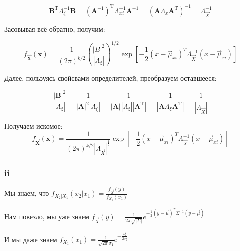 \documentclass[a4paper,12pt]{article}
\begin{document}
\[
\mathbf{B}^{\mathrm{T}} \Lambda_{\xi}^{-1} \mathbf{B}=\left(\mathbf{A}^{-1}\right)^{\mathrm{T}} \Lambda_{xi}^{-1} \mathbf{A}^{-1}=\left(\mathbf{A} \Lambda_{x} \mathbf{A}^{\mathrm{T}}\right)^{-1}=\Lambda_{\vec{X}}^{-1}
\]

Засовывая всё обратно, получим:

\[
f_{\mathbf{\vec{X}}}(\boldsymbol{x})=\frac{1}{(2 \pi)^{k / 2}}\left(\frac{|B|^{2}}{\left|\Lambda_{\xi}\right|}\right)^{1 / 2} \exp \left[-\frac{1}{2}\left(x-\vec{\mu}_{xi}\right)^T\Lambda_{\vec{X}}^{-1}\left(x-\vec{\mu}_{xi} \right)\right]
\]

Далее, пользуясь свойсвами определителей, преобразуем оставшееся:


\[
\frac{|\mathbf{B}|^{2}}{\left|\Lambda_{\xi}\right|}=  \frac{1}{|\mathbf{A}|^2\left|\Lambda_{\xi}\right|}=
\frac{1}{|\mathbf{A}|\left|\Lambda_{\xi}\right|\left|\mathbf{A}^{\mathrm{T}}\right|}=\frac{1}{\left|\mathbf{A} \Lambda_{\xi} \mathbf{A}^{\mathrm{T}}\right|}=\frac{1}{\left|\Lambda_{\vec{X}}\right|}
\]

Получаем искомое:
\[
f_{\mathbf{\vec{X}}}(\boldsymbol{x})=\frac{1}{(2 \pi)^{k / 2}\left|\Lambda_{\vec{X}}\right|^{\frac{1}{2}}} \exp \left[-\frac{1}{2}\left(x-\vec{\mu}_{xi}\right)^T\Lambda_{\vec{X}}^{-1}\left(x-\vec{\mu}_{xi} \right)\right]
\]


\subsubsection{ii}

Мы знаем, что 
$ f_{X_2 | X_1} (x_2 | x_1) = \frac{f_{\vec{X}} (y)}{f_{X_1} (x_1)}$

Нам повезло, мы уже знаем $ f_{\vec{X}} (y) = \frac{1}{2\pi \sqrt{|\Sigma|}} e^{-\frac{1}{2} (y - \vec{\mu})^T \Sigma^{-1} (y - \vec{\mu})}$

И мы даже знаем $ f_{X_1} (x_1) = \frac{1}{\sqrt{2\pi} \sigma_1} e^{-\frac{x_1^2}{2\sigma_1^2}}$
\end{document}
